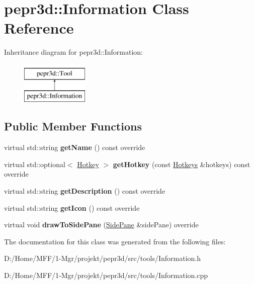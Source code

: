 \hypertarget{classpepr3d_1_1_information}{}\section{pepr3d\+::Information Class Reference}
\label{classpepr3d_1_1_information}
Inheritance diagram for pepr3d\+::Information\+:\begin{figure}[H]
\begin{center}
\leavevmode
\includegraphics[height=2.000000cm]{classpepr3d_1_1_information}
\end{center}
\end{figure}
\subsection*{Public Member Functions}
\begin{DoxyCompactItemize}
\item 
\mbox{\label{classpepr3d_1_1_information_a47a2d35503bb815b00b1af744b756c01}} 
virtual std\+::string {\bfseries get\+Name} () const override
\item 
\mbox{\label{classpepr3d_1_1_information_a60e2c3f0fd0426bf321b611f2dd6739c}} 
virtual std\+::optional$<$ \mbox{\hyperlink{structpepr3d_1_1_hotkey}{Hotkey}} $>$ {\bfseries get\+Hotkey} (const \mbox{\hyperlink{classpepr3d_1_1_hotkeys}{Hotkeys}} \&hotkeys) const override
\item 
\mbox{\label{classpepr3d_1_1_information_a5520aaebfdfc050b9d637fa04f21b79c}} 
virtual std\+::string {\bfseries get\+Description} () const override
\item 
\mbox{\label{classpepr3d_1_1_information_ae3de34239571758b64090255ac9cf223}} 
virtual std\+::string {\bfseries get\+Icon} () const override
\item 
\mbox{\label{classpepr3d_1_1_information_aaf1074d0f4f7055de706d8561ce14ed2}} 
virtual void {\bfseries draw\+To\+Side\+Pane} (\mbox{\hyperlink{classpepr3d_1_1_side_pane}{Side\+Pane}} \&side\+Pane) override
\end{DoxyCompactItemize}


The documentation for this class was generated from the following files\+:\begin{DoxyCompactItemize}
\item 
D\+:/\+Home/\+M\+F\+F/1-\/\+Mgr/projekt/pepr3d/src/tools/Information.\+h\item 
D\+:/\+Home/\+M\+F\+F/1-\/\+Mgr/projekt/pepr3d/src/tools/Information.\+cpp\end{DoxyCompactItemize}
